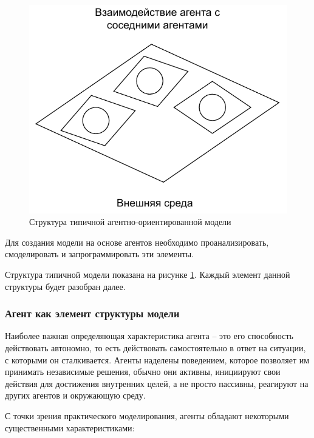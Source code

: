 \begin{figure}[hbtp]
	\centering
	\includegraphics[scale=0.8]{img/typical-model.drawio.pdf}
	\caption{Структура типичной агентно-ориентированной модели}
	\label{typical-model}
\end{figure}

Для создания модели на основе агентов необходимо проанализировать, смоделировать и запрограммировать эти элементы. 

Структура типичной модели показана на рисунке \ref{typical-model}. Каждый элемент данной структуры будет разобран далее.

\subsubsection{Агент как элемент структуры модели}

Наиболее важная определяющая характеристика агента – это его способность действовать автономно, то есть действовать самостоятельно в ответ на ситуации, с которыми он сталкивается. Агенты наделены поведением, которое позволяет им принимать независимые решения, обычно они активны, инициируют свои действия для достижения внутренних целей, а не просто пассивны, реагируют на других агентов и окружающую среду.

С точки зрения практического моделирования, агенты обладают некоторыми существенными характеристиками:

